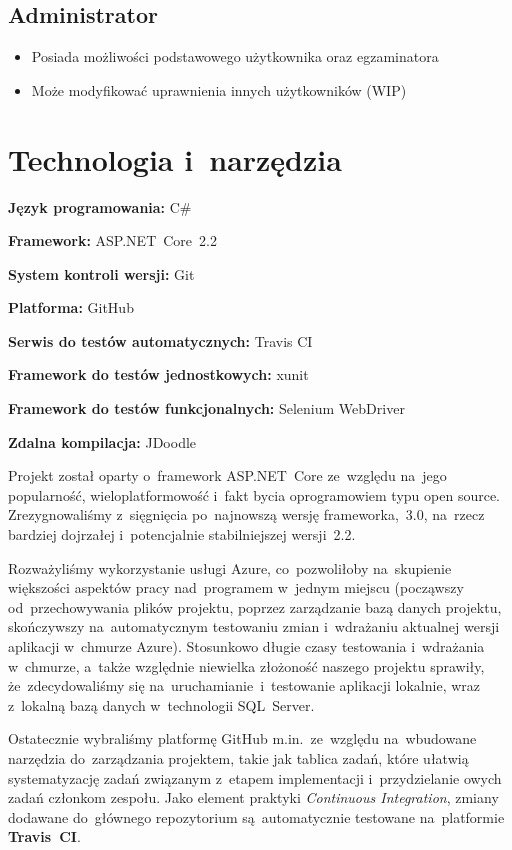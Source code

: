 \documentclass{article}
\begin{document}
\subsection{Administrator}
\begin{itemize}
    \item Posiada możliwości podstawowego użytkownika oraz egzaminatora
    \item Może modyfikować uprawnienia innych użytkowników (WIP)
\end{itemize}

\section{Technologia i~narzędzia}

\textbf{Język programowania:} C\#

\textbf{Framework:} ASP.NET~Core~2.2

\textbf{System kontroli wersji:} Git

\textbf{Platforma:} GitHub

\textbf{Serwis do testów automatycznych:} Travis CI

\textbf{Framework do testów jednostkowych:} xunit

\textbf{Framework do testów funkcjonalnych:} Selenium WebDriver

\textbf{Zdalna kompilacja:} JDoodle

Projekt został oparty o~framework ASP.NET~Core ze~względu na~jego popularność, wieloplatformowość i~fakt bycia oprogramowiem typu open source. Zrezygnowaliśmy z~sięgnięcia po~najnowszą wersję frameworka,~3.0, na~rzecz bardziej dojrzałej i~potencjalnie stabilniejszej wersji~2.2.

Rozważyliśmy wykorzystanie usługi Azure, co~pozwoliłoby na~skupienie większości aspektów pracy nad~programem w~jednym miejscu (począwszy od~przechowywania plików projektu, poprzez zarządzanie bazą danych projektu, skończywszy na~automatycznym testowaniu zmian i~wdrażaniu aktualnej wersji aplikacji w~chmurze Azure). Stosunkowo długie czasy testowania i~wdrażania w~chmurze, a~także względnie niewielka złożoność naszego projektu sprawiły, że~zdecydowaliśmy się na~uruchamianie~i~testowanie aplikacji lokalnie, wraz z~lokalną bazą danych w~technologii SQL~Server.

Ostatecznie wybraliśmy platformę GitHub m.in.~ze~względu na~wbudowane narzędzia do~zarządzania projektem, takie jak tablica zadań, które ułatwią systematyzację zadań związanym z~etapem implementacji i~przydzielanie owych zadań członkom zespołu. Jako element praktyki \emph{Continuous Integration}, zmiany dodawane do~głównego repozytorium są~automatycznie testowane na~platformie \textbf{Travis~CI}.
\end{document}
